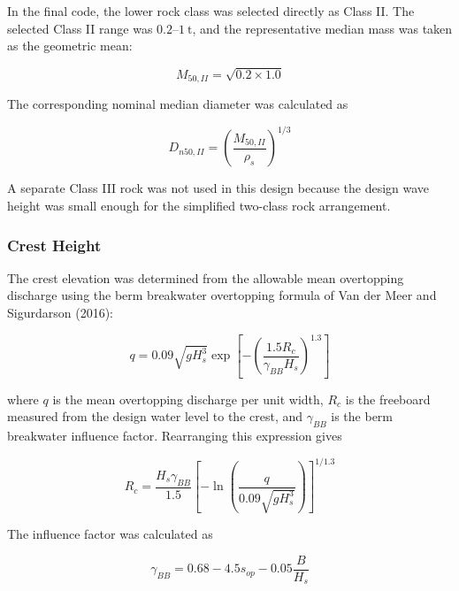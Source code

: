 \documentclass[a4paper, 11pt]{article}
\begin{document}
In the final code, the lower rock class was selected directly as Class II. The selected Class II range was \(0.2\text{--}1~\mathrm{t}\), and the representative median mass was taken as the geometric mean:

\begin{equation}
    M_{50,II}=\sqrt{0.2\times1.0}
    \label{eq:berm_M50_II}
\end{equation}

The corresponding nominal median diameter was calculated as

\begin{equation}
    D_{n50,II}=\left(\frac{M_{50,II}}{\rho_s}\right)^{1/3}
    \label{eq:berm_Dn50_II}
\end{equation}

A separate Class III rock was not used in this design because the design wave height was small enough for the simplified two-class rock arrangement.

\subsubsection{Crest Height}

\hspace*{0.5cm} The crest elevation was determined from the allowable mean overtopping discharge using the berm breakwater overtopping formula of Van der Meer and Sigurdarson (2016):

\begin{equation}
    q=0.09\sqrt{gH_s^3}
    \exp\left[
    -\left(
    \frac{1.5R_c}{\gamma_{BB}H_s}
    \right)^{1.3}
    \right]
    \label{eq:berm_overtopping}
\end{equation}

where \(q\) is the mean overtopping discharge per unit width, \(R_c\) is the freeboard measured from the design water level to the crest, and \(\gamma_{BB}\) is the berm breakwater influence factor. Rearranging this expression gives

\begin{equation}
    R_c=
    \frac{H_s\gamma_{BB}}{1.5}
    \left[
    -\ln\left(
    \frac{q}{0.09\sqrt{gH_s^3}}
    \right)
    \right]^{1/1.3}
    \label{eq:berm_Rc}
\end{equation}

The influence factor was calculated as

\begin{equation}
    \gamma_{BB}=0.68-4.5s_{op}-0.05\frac{B}{H_s}
    \label{eq:berm_gammaBB}
\end{equation}
\end{document}
